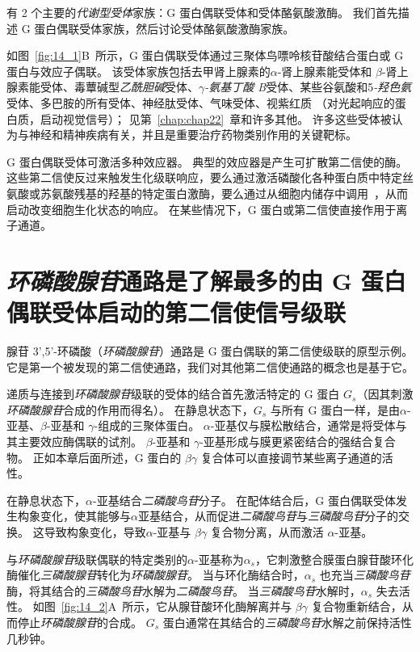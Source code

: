 有 2 个主要的\textit{代谢型受体}家族：G 蛋白偶联受体和受体酪氨酸激酶。
我们首先描述 G 蛋白偶联受体家族，然后讨论受体酪氨酸激酶家族。


如图~\ref{fig:14_1}B~所示，G 蛋白偶联受体通过三聚体鸟嘌呤核苷酸结合蛋白或 G 蛋白与效应子偶联。
该受体家族包括去甲肾上腺素的$\alpha$-肾上腺素能受体和 $\beta$-肾上腺素能受体、毒蕈碱型\textit{乙酰胆碱}受体、\textit{$\gamma$-氨基丁酸 B}受体、某些谷氨酸和5\textit{-羟色氨}受体、多巴胺的所有受体、神经肽受体、气味受体、视紫红质 （对光起响应的蛋白质，启动视觉信号）；
见第~\ref{chap:chap22}~章和许多其他。
许多这些受体被认为与神经和精神疾病有关，并且是重要治疗药物类别作用的关键靶标。


G 蛋白偶联受体可激活多种效应器。
典型的效应器是产生可扩散第二信使的酶。
这些第二信使反过来触发生化级联响应，要么通过激活磷酸化各种蛋白质中特定丝氨酸或苏氨酸残基的羟基的特定蛋白激酶，要么通过从细胞内储存中调用~，从而启动改变细胞生化状态的响应。
在某些情况下，G 蛋白或第二信使直接作用于离子通道。



\section{\textit{环磷酸腺苷}通路是了解最多的由 G 蛋白偶联受体启动的第二信使信号级联}

腺苷 3',5'-环磷酸（\textit{环磷酸腺苷}）通路是 G 蛋白偶联的第二信使级联的原型示例。
它是第一个被发现的第二信使通路，我们对其他第二信使通路的概念也是基于它。


递质与连接到\textit{环磷酸腺苷}级联的受体的结合首先激活特定的 G 蛋白 $ G_s $（因其刺激\textit{环磷酸腺苷}合成的作用而得名）。
在静息状态下，$ G_s $ 与所有 G 蛋白一样，是由$\alpha$-亚基、$\beta$-亚基和 $\gamma$-组成的三聚体蛋白。
$\alpha$-亚基仅与膜松散结合，通常是将受体与其主要效应酶偶联的试剂。
$\beta$-亚基和 $\gamma$-亚基形成与膜更紧密结合的强结合复合物。
正如本章后面所述，G 蛋白的 $\beta \gamma$ 复合体可以直接调节某些离子通道的活性。


在静息状态下，$\alpha$-亚基结合\textit{二磷酸鸟苷}分子。
在配体结合后，G 蛋白偶联受体发生构象变化，使其能够与$\alpha$亚基结合，从而促进\textit{二磷酸鸟苷}与\textit{三磷酸鸟苷}分子的交换。
这导致构象变化，导致$\alpha$-亚基与 $\beta \gamma$ 复合物分离，从而激活 $\alpha$-亚基。


与\textit{环磷酸腺苷}级联偶联的特定类别的$\alpha$-亚基称为$\alpha_s$，它刺激整合膜蛋白腺苷酸环化酶催化\textit{三磷酸腺苷}转化为\textit{环磷酸腺苷}。
当与环化酶结合时，$\alpha_s$ 也充当\textit{三磷酸鸟苷}酶，将其结合的\textit{三磷酸鸟苷}水解为\textit{二磷酸鸟苷}。
当\textit{三磷酸鸟苷}水解时，$\alpha_s$ 失去活性。
如图~\ref{fig:14_2}A~所示，它从腺苷酸环化酶解离并与 $\beta \gamma$ 复合物重新结合，从而停止\textit{环磷酸腺苷}的合成。
$ G_s $ 蛋白通常在其结合的\textit{三磷酸鸟苷}水解之前保持活性几秒钟。


